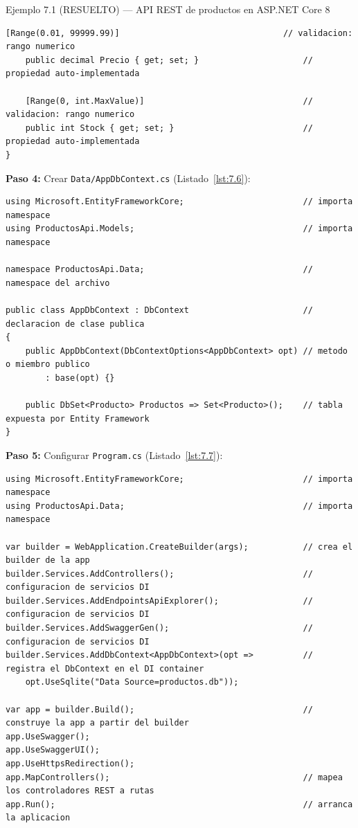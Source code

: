\documentclass[11pt,a4paper,openany]{book}
\begin{document}
\begin{cajaejemplo}{Ejemplo 7.1 (RESUELTO) --- API REST de productos en ASP.NET Core 8}
\begin{lstlisting}[style=cs,caption={Models/Producto.cs},label=lst:7.5]
    [Range(0.01, 99999.99)]                                 // validacion: rango numerico
    public decimal Precio { get; set; }                     // propiedad auto-implementada

    [Range(0, int.MaxValue)]                                // validacion: rango numerico
    public int Stock { get; set; }                          // propiedad auto-implementada
}
\end{lstlisting}

\textbf{Paso 4:} Crear \texttt{Data/AppDbContext.cs} (Listado~\ref{lst:7.6}):

\begin{lstlisting}[style=cs,caption={Data/AppDbContext.cs},label=lst:7.6]
using Microsoft.EntityFrameworkCore;                        // importa namespace
using ProductosApi.Models;                                  // importa namespace

namespace ProductosApi.Data;                                // namespace del archivo

public class AppDbContext : DbContext                       // declaracion de clase publica
{
    public AppDbContext(DbContextOptions<AppDbContext> opt) // metodo o miembro publico
        : base(opt) {}

    public DbSet<Producto> Productos => Set<Producto>();    // tabla expuesta por Entity Framework
}
\end{lstlisting}

\textbf{Paso 5:} Configurar \texttt{Program.cs} (Listado~\ref{lst:7.7}):

\begin{lstlisting}[style=cs,caption={Program.cs},label=lst:7.7]
using Microsoft.EntityFrameworkCore;                        // importa namespace
using ProductosApi.Data;                                    // importa namespace

var builder = WebApplication.CreateBuilder(args);           // crea el builder de la app
builder.Services.AddControllers();                          // configuracion de servicios DI
builder.Services.AddEndpointsApiExplorer();                 // configuracion de servicios DI
builder.Services.AddSwaggerGen();                           // configuracion de servicios DI
builder.Services.AddDbContext<AppDbContext>(opt =>          // registra el DbContext en el DI container
    opt.UseSqlite("Data Source=productos.db"));

var app = builder.Build();                                  // construye la app a partir del builder
app.UseSwagger();
app.UseSwaggerUI();
app.UseHttpsRedirection();
app.MapControllers();                                       // mapea los controladores REST a rutas
app.Run();                                                  // arranca la aplicacion
\end{lstlisting}


\end{cajaejemplo}
\end{document}
